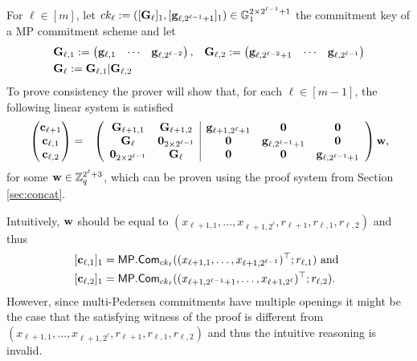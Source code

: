 For \(\ell\in[m]\), let \(ck_\ell:=([\mathbf{{G}}_\ell]_1,\allowbreak[\mathbf{g}_{\ell,2^{\ell-1}+1}]_1)\in\mathbb{G}_1^{2\times{2^{\ell-1}+1}}\) the commitment key of a MP commitment scheme and let
\begin{align*}
&\mathbf{{G}}_{\ell,1}:=
\begin{pmatrix}
    \mathbf{g}_{\ell,1}&\cdots&\mathbf{g}_{\ell,2^{\ell-2}}
\end{pmatrix},
&\mathbf{{G}}_{\ell,2}:=
\begin{pmatrix}
    \mathbf{g}_{\ell,2^{\ell-2}+1}&\cdots&\mathbf{g}_{\ell,2^{\ell-1}}
\end{pmatrix}\\
&\mathbf{{G}}_\ell:=\mathbf{{G}}_{\ell,1}|\mathbf{{G}}_{\ell,2}
\end{align*}
To prove consistency the prover will show that, for each $\ell\in [m-1]$, the following linear system is satisfied
{\begin{align}
&\begin{pmatrix}
\mathbf{c}_{\ell+1}\\
\mathbf{c}_{\ell,1}\\
\mathbf{c}_{\ell,2}
\end{pmatrix}
=
&\left(\begin{array}{cc|ccc}
\mathbf{{G}}_{\ell+1,1}           & \mathbf{{G}}_{\ell+1,2}            & \mathbf{g}_{\ell+1,2^\ell+1} & \mathbf{0}                     & \mathbf{0}\\
\mathbf{{G}}_{\ell}               & \mathbf{{0}}_{2\times2^{\ell-1}}   & \mathbf{0}                   & \mathbf{g}_{\ell,2^{\ell-1}+1} & \mathbf{0} \\
\mathbf{{0}}_{2\times 2^{\ell-1}} & \mathbf{{G}}_{\ell}                & \mathbf{0}                   & \mathbf{0}                     & \mathbf{g}_{\ell,2^{\ell-1}+1}
\end{array}\right)
\mathbf{w},\label{eq-log-split}
\end{align}}%
for some \(\mathbf{w}\in\mathbb{Z}_q^{2^\ell+3}\), which can be proven using the proof system from Section \ref{sec:concat}.

Intuitively, \(\mathbf{w}\) should be equal to \((x_{\ell+1,1},\ldots,x_{\ell+1,2^{\ell}},\allowbreak r_{\ell+1},r_{\ell,1},r_{\ell,2})\) and thus 
\begin{align*}
&[\mathbf{c}_{\ell,1}]_1=\mathsf{MP}.\mathsf{Com}_{ck_\ell}(\allowbreak(x_{\ell+1,1},\ldots,x_{\ell+1,2^{\ell-1}})^\top;r_{\ell,1})\text{ and }\\
&[\mathbf{c}_{\ell,2}]_1=\mathsf{MP}.\mathsf{Com}_{ck_\ell}((x_{\ell+1,2^{\ell-1}+1},\ldots, x_{\ell+1,2^{\ell}})^\top;r_{\ell,2}).
\end{align*}
However, since multi-Pedersen commitments have multiple openings it might be the case that the satisfying witness of the proof is different from \((x_{\ell+1,1},\ldots,\allowbreak x_{\ell+1,2^\ell},r_{\ell+1},r_{\ell,1},r_{\ell,2})\) and thus the intuitive reasoning is invalid.

